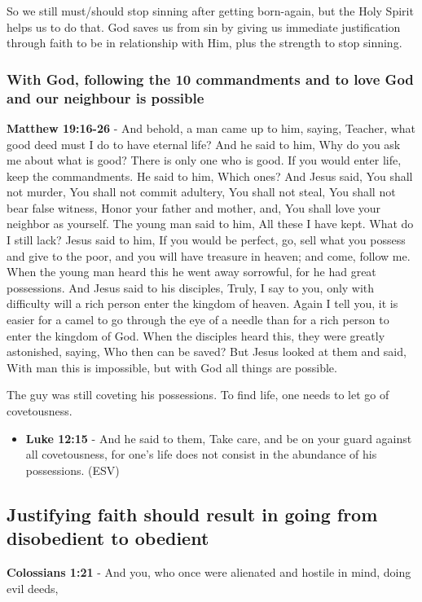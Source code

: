 \documentclass[11pt]{article}
\begin{document}
So we still must/should stop sinning after getting born-again, but the Holy Spirit helps us to do that.
God saves us from sin by giving us immediate justification through faith to be in relationship with Him, plus the strength to stop sinning.

\subsubsection{With God, following the 10 commandments and to love God and our neighbour is possible}
\label{sec:orgbb8052b}

\textbf{Matthew 19:16-26} - And behold, a man came up to him, saying, Teacher, what good deed must I do to have eternal life? And he said to him, Why do you ask me about what is good? There is only one who is good. If you would enter life, keep the commandments. He said to him, Which ones? And Jesus said, You shall not murder, You shall not commit adultery, You shall not steal, You shall not bear false witness, Honor your father and mother, and, You shall love your neighbor as yourself. The young man said to him, All these I have kept. What do I still lack? Jesus said to him, If you would be perfect, go, sell what you possess and give to the poor, and you will have treasure in heaven; and come, follow me. When the young man heard this he went away sorrowful, for he had great possessions. And Jesus said to his disciples, Truly, I say to you, only with difficulty will a rich person enter the kingdom of heaven. Again I tell you, it is easier for a camel to go through the eye of a needle than for a rich person to enter the kingdom of God. When the disciples heard this, they were greatly astonished, saying, Who then can be saved? But Jesus looked at them and said, With man this is impossible, but with God all things are possible.

The guy was still coveting his possessions. To find life, one needs to let go of covetousness.

\begin{itemize}
\item \textbf{Luke 12:15} - And he said to them, Take care, and be on your guard against all covetousness, for one's life does not consist in the abundance of his possessions. (ESV)
\end{itemize}

\subsection{Justifying faith should result in going from disobedient to obedient}
\label{sec:orgb0bbce9}
\textbf{Colossians 1:21} - And you, who once were alienated and hostile in mind, doing evil deeds,
\end{document}
